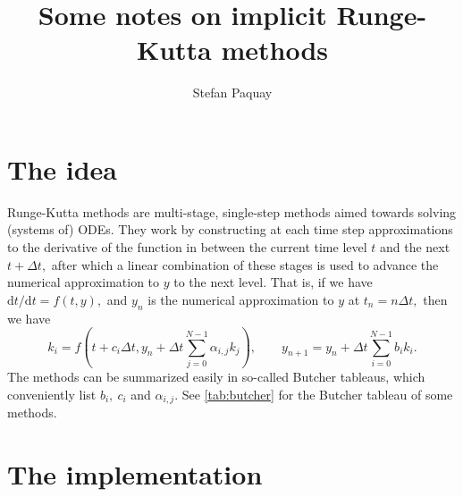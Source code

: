 \documentclass[10pt,a4paper]{article}
\title{ Some notes on implicit Runge-Kutta methods }
\author{ Stefan Paquay }
\date{  }
\newcommand{\dd}[0]{ \mathrm{d} }
\begin{document}
\maketitle

\section{The idea}
Runge-Kutta methods are multi-stage, single-step methods aimed towards solving (systems of) ODEs.
They work by constructing at each time step approximations to the derivative of the function in between the current time level $t$ and the next $t + \Delta t,$ after which a linear combination of these stages is used to advance the numerical approximation to $y$ to the next level.
That is, if we have $\dd t/ \dd t = f(t,y),$ and $y_n$ is the numerical approximation to $y$ at $t_n = n \Delta t,$ then we have
\begin{equation*}
  k_i = f\left( t + c_i \Delta t, y_n + \Delta t \sum_{j=0}^{N-1} \alpha_{i,j} k_j \right), \qquad y_{n+1} = y_n + \Delta t \sum_{i=0}^{N-1} b_i k_i.
\end{equation*}
The methods can be summarized easily in so-called Butcher tableaus, which conveniently list $b_i,~c_i$ and $\alpha_{i,j}.$ See \ref{tab:butcher} for the Butcher tableau of some methods.

\section{The implementation}
\end{document}
